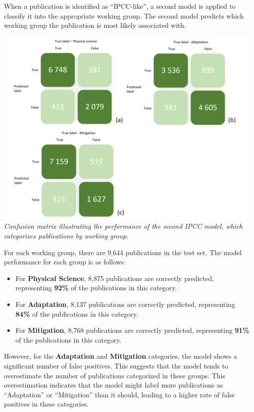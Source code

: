 \documentclass[
]{article}
\providecommand{\tightlist}{%
  \setlength{\itemsep}{0pt}\setlength{\parskip}{0pt}}
\begin{document}
When a publication is identified as ``IPCC-like'', a second model is
applied to classify it into the appropriate working group. The second
model predicts which working group the publication is most likely
associated with.

\includegraphics{./images/teds_ipcc_model_wg.png} \emph{Confusion matrix
illustrating the performance of the second IPCC model, which categorizes
publications by working group.}

For each working group, there are 9,644 publications in the test set.
The model performance for each group is as follows:

\begin{itemize}
\tightlist
\item
  For \textbf{Physical Science}, 8,875 publications are correctly
  predicted, representing \textbf{92\%} of the publications in this
  category.
\item
  For \textbf{Adaptation}, 8,137 publications are correctly predicted,
  representing \textbf{84\%} of the publications in this category.
\item
  For \textbf{Mitigation}, 8,768 publications are correctly predicted,
  representing \textbf{91\%} of the publications in this category.
\end{itemize}

However, for the \textbf{Adaptation} and \textbf{Mitigation} categories,
the model shows a significant number of false positives. This suggests
that the model tends to overestimate the number of publications
categorized in these groups. This overestimation indicates that the
model might label more publications as ``Adaptation'' or ``Mitigation''
than it should, leading to a higher rate of false positives in these
categories.
\end{document}
